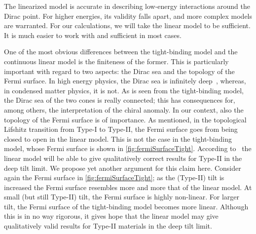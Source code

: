 



The linearized model is accurate in describing low-energy interactions around the Dirac point.
For higher energies, its validity falls apart, and more complex models are warranted.
For our calculations, we will take the linear model to be sufficient.
It is much easier to work with and sufficient in most cases.

\label{sec:tilt:fermisurface-paragraph}
One of the most obvious differences between the tight-binding model and the continuous linear model is the finiteness of the former.
This is particularly important with regard to two aspects: the Dirac sea and the topology of the Fermi surface.
In high energy physics, the Dirac sea is infinitely deep~\cites{burkovTopologicalSemimetals2016,vozmedianoTheoreticalPhysicsColloquium2021}, whereas, in condensed matter physics, it is not.
As is seen from the tight-binding model, the Dirac sea of the two cones is really connected;
this has consequences for, among others, the interpretation of the chiral anomaly.
In our context, also the topology of the Fermi surface is of importance.
As mentioned, in the topological Lifshitz transition from Type-I to Type-II, the Fermi surface goes from being closed to open in the linear model.
This is not the case in the tight-binding model, whose Fermi surface is shown in \cref{fig:fermiSurfaceTight}.
According to~\textcite{ferreirosAnomalousNernstThermal2017} the linear model will be able to give qualitatively correct results for Type-II in the deep tilt limit.
We propose yet another argument for this claim here.
Consider again the Fermi surface in \cref{fig:fermiSurfaceTight};
as the (Type-II) tilt is increased the Fermi surface resembles more and more that of the linear model.
At small (but still Type-II) tilt, the Fermi surface is highly non-linear.
For larger tilt, the Fermi surface of the tight-binding model becomes more linear.
Although this is in no way rigorous, it gives hope that the linear model may give qualitatively valid results for Type-II materials in the deep tilt limit.

